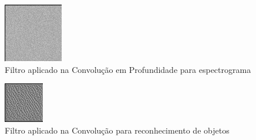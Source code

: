 \documentclass{bmvc2k}
\begin{document}
\begin{figure}[htbp]
\includegraphics[scale=3]{imagens/filtrospeech.png} 
\centering
\caption{Filtro aplicado na Convolução em Profundidade para espectrograma}
\label{fspeech}
\end{figure}

\begin{figure}[htbp]
\includegraphics[scale=4]{imagens/filtroobj.png} 
\centering
\caption{Filtro aplicado na Convolução para reconhecimento de objetos}
\label{fobj}
\end{figure}
\end{document}
